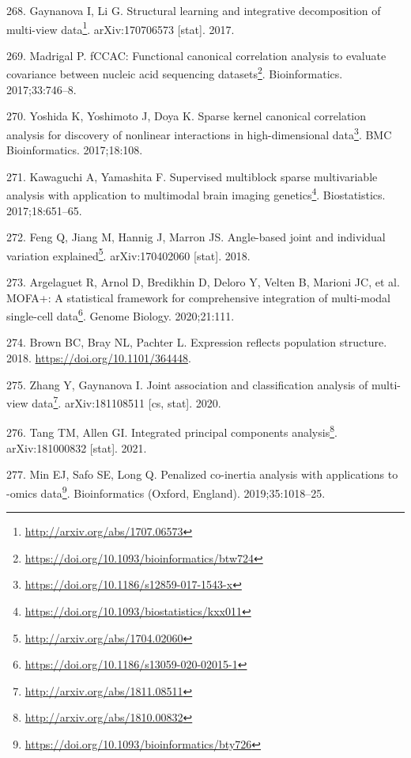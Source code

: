 \documentclass[
  12pt,
  a4paper,
  twoside,
  openright]{book}
\DeclareRobustCommand{\href}[2]{#2\footnote{\url{#1}}}
\newlength{\cslhangindent}
\newlength{\cslentryspacingunit} %
\newenvironment{CSLReferences}[2] %
 {%
  \setlength{\parindent}{0pt}
  \ifodd #1
  \let\oldpar\par
  \def\par{\hangindent=\cslhangindent\oldpar}
  \fi
  \setlength{\parskip}{#2\cslentryspacingunit}
 }%
 {}
\begin{document}
\begin{CSLReferences}{0}{0}
\leavevmode{}%
268. Gaynanova I, Li G. \href{http://arxiv.org/abs/1707.06573}{Structural learning and integrative decomposition of multi-view data}. arXiv:170706573 {[}stat{]}. 2017.

\leavevmode{}%
269. Madrigal P. \href{https://doi.org/10.1093/bioinformatics/btw724}{fCCAC: Functional canonical correlation analysis to evaluate covariance between nucleic acid sequencing datasets}. Bioinformatics. 2017;33:746--8.

\leavevmode{}%
270. Yoshida K, Yoshimoto J, Doya K. \href{https://doi.org/10.1186/s12859-017-1543-x}{Sparse kernel canonical correlation analysis for discovery of nonlinear interactions in high-dimensional data}. BMC Bioinformatics. 2017;18:108.

\leavevmode{}%
271. Kawaguchi A, Yamashita F. \href{https://doi.org/10.1093/biostatistics/kxx011}{Supervised multiblock sparse multivariable analysis with application to multimodal brain imaging genetics}. Biostatistics. 2017;18:651--65.

\leavevmode{}%
272. Feng Q, Jiang M, Hannig J, Marron JS. \href{http://arxiv.org/abs/1704.02060}{Angle-based joint and individual variation explained}. arXiv:170402060 {[}stat{]}. 2018.

\leavevmode{}%
273. Argelaguet R, Arnol D, Bredikhin D, Deloro Y, Velten B, Marioni JC, et al. \href{https://doi.org/10.1186/s13059-020-02015-1}{MOFA+: A statistical framework for comprehensive integration of multi-modal single-cell data}. Genome Biology. 2020;21:111.

\leavevmode{}%
274. Brown BC, Bray NL, Pachter L. Expression reflects population structure. 2018. \url{https://doi.org/10.1101/364448}.

\leavevmode{}%
275. Zhang Y, Gaynanova I. \href{http://arxiv.org/abs/1811.08511}{Joint association and classification analysis of multi-view data}. arXiv:181108511 {[}cs, stat{]}. 2020.

\leavevmode{}%
276. Tang TM, Allen GI. \href{http://arxiv.org/abs/1810.00832}{Integrated principal components analysis}. arXiv:181000832 {[}stat{]}. 2021.

\leavevmode{}%
277. Min EJ, Safo SE, Long Q. \href{https://doi.org/10.1093/bioinformatics/bty726}{Penalized co-inertia analysis with applications to -omics data}. Bioinformatics (Oxford, England). 2019;35:1018--25.


\end{CSLReferences}
\end{document}

